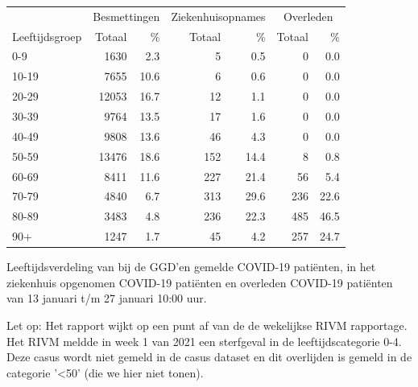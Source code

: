 \documentclass[
  english,
  man,floatsintext]{apa6}
\begin{document}
\begin{table}[H]
\centering\begingroup\fontsize{11}{13}\selectfont

\begin{threeparttable}
\begin{tabular}{lrrrrrr}
\toprule
\multicolumn{1}{c}{ } & \multicolumn{2}{c}{Besmettingen} & \multicolumn{2}{c}{Ziekenhuisopnames} & \multicolumn{2}{c}{Overleden} \\
\cmidrule(l{3pt}r{3pt}){2-3} \cmidrule(l{3pt}r{3pt}){4-5} \cmidrule(l{3pt}r{3pt}){6-7}
Leeftijdsgroep & Totaal & \% & Totaal & \% & Totaal & \%\\
\midrule
0-9 & 1630 & 2.3 & 5 & 0.5 & 0 & 0.0\\
10-19 & 7655 & 10.6 & 6 & 0.6 & 0 & 0.0\\
20-29 & 12053 & 16.7 & 12 & 1.1 & 0 & 0.0\\
30-39 & 9764 & 13.5 & 17 & 1.6 & 0 & 0.0\\
40-49 & 9808 & 13.6 & 46 & 4.3 & 0 & 0.0\\
50-59 & 13476 & 18.6 & 152 & 14.4 & 8 & 0.8\\
60-69 & 8411 & 11.6 & 227 & 21.4 & 56 & 5.4\\
70-79 & 4840 & 6.7 & 313 & 29.6 & 236 & 22.6\\
80-89 & 3483 & 4.8 & 236 & 22.3 & 485 & 46.5\\
90+ & 1247 & 1.7 & 45 & 4.2 & 257 & 24.7\\
\bottomrule
\end{tabular}
\begin{tablenotes}
\item[1] Leeftijdsverdeling van bij de GGD’en gemelde COVID-19 patiënten, in het ziekenhuis opgenomen COVID-19 patiënten en overleden COVID-19 patiënten van 13 januari t/m 27 januari 10:00 uur.
\item[2] Let op: Het rapport wijkt op een punt af van de de wekelijkse RIVM rapportage. Het RIVM meldde in week 1 van 2021 een sterfgeval in de leeftijdscategorie 0-4. Deze casus wordt niet gemeld in de casus dataset en dit overlijden is gemeld in de categorie '<50' (die we hier niet tonen).
\end{tablenotes}
\end{threeparttable}
\endgroup{}
\end{table}

\newpage
\end{document}
